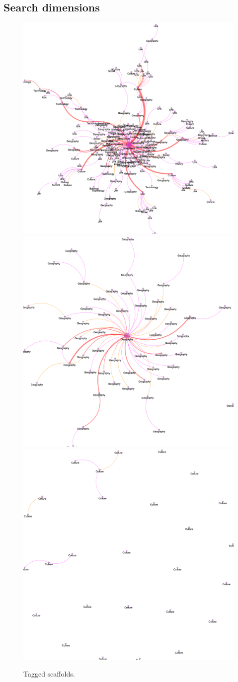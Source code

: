 \documentclass[fleqn,10pt]{wlscirep}
\begin{document}

\subsection*{Search dimensions}
\begin{figure}[H]
\centering
\includegraphics[width=0.32\linewidth]{figs/mysql_Mursuka_reduced_tags.png}
\includegraphics[width=0.32\linewidth]{figs/mysql_Mursuka_reduced_tagsub_geo.png}
\includegraphics[width=0.32\linewidth]{figs/mysql_Mursuka_reduced_tagsub_cult.png}
\caption{Tagged scaffolds.}
\label{fig:scaftag}
\end{figure}
\end{document}
